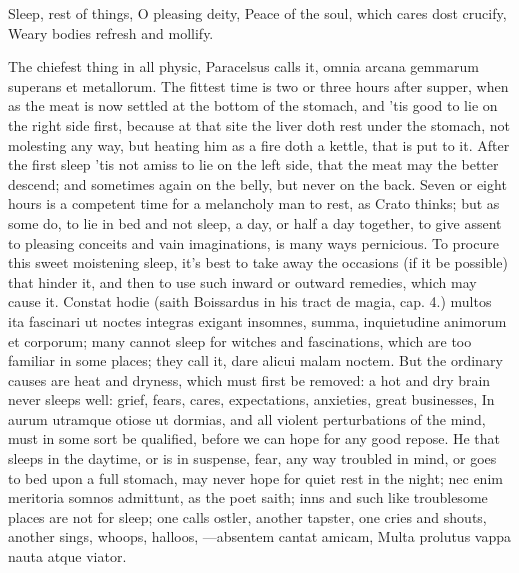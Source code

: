 {Sleep, rest of things, O pleasing deity,
Peace of the soul, which cares dost crucify,
Weary bodies refresh and mollify.

The chiefest thing in all physic, Paracelsus calls it, omnia
arcana gemmarum superans et metallorum. The fittest time is two
or three hours after supper, when as the meat is now settled at the
bottom of the stomach, and 'tis good to lie on the right side first,
because at that site the liver doth rest under the stomach, not
molesting any way, but heating him as a fire doth a kettle, that is put
to it. After the first sleep 'tis not amiss to lie on the left side,
that the meat may the better descend; and sometimes again on the belly,
but never on the back. Seven or eight hours is a competent time for a
melancholy man to rest, as Crato thinks; but as some do, to lie in bed
and not sleep, a day, or half a day together, to give assent to
pleasing conceits and vain imaginations, is many ways pernicious. To
procure this sweet moistening sleep, it's best to take away the
occasions (if it be possible) that hinder it, and then to use such
inward or outward remedies, which may cause it. Constat hodie (saith
Boissardus in his tract de magia, cap. 4.) multos ita fascinari ut
noctes integras exigant insomnes, summa, inquietudine animorum et
corporum; many cannot sleep for witches and fascinations, which are too
familiar in some places; they call it, dare alicui malam noctem. But
the ordinary causes are heat and dryness, which must first be removed:
a hot and dry brain never sleeps well: grief, fears, cares,
expectations, anxieties, great businesses, In aurum utramque
otiose ut dormias, and all violent perturbations of the mind, must in
some sort be qualified, before we can hope for any good repose. He that
sleeps in the daytime, or is in suspense, fear, any way troubled in
mind, or goes to bed upon a full stomach, may never hope for
quiet rest in the night; nec enim meritoria somnos admittunt, as the
poet saith; inns and such like troublesome places are not for
sleep; one calls ostler, another tapster, one cries and shouts, another
sings, whoops, halloos,
---absentem cantat amicam,
Multa prolutus vappa nauta atque viator.

}
